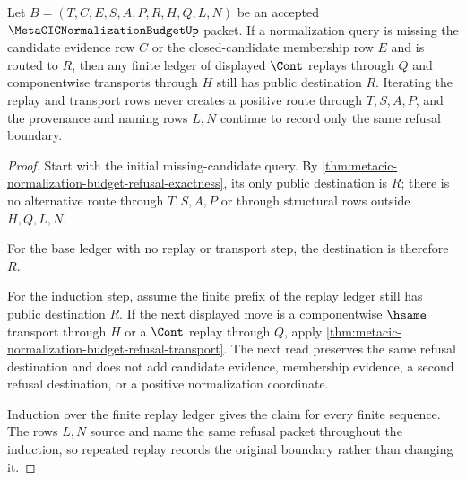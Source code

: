 \begin{theorem}
\label{thm:metacic-normalization-budget-refusal-idempotence}
Let $B=(T,C,E,S,A,P,R,H,Q,L,N)$ be an accepted $\MetaCICNormalizationBudgetUp$ packet. If a normalization query is missing the candidate evidence row $C$ or the closed-candidate membership row $E$ and is routed to $R$, then any finite ledger of displayed $\Cont$ replays through $Q$ and componentwise transports through $H$ still has public destination $R$. Iterating the replay and transport rows never creates a positive route through $T,S,A,P$, and the provenance and naming rows $L,N$ continue to record only the same refusal boundary.
\end{theorem}
\begin{proof}
Start with the initial missing-candidate query. By \autoref{thm:metacic-normalization-budget-refusal-exactness}, its only public destination is $R$; there is no alternative route through $T,S,A,P$ or through structural rows outside $H,Q,L,N$.

For the base ledger with no replay or transport step, the destination is therefore $R$.

For the induction step, assume the finite prefix of the replay ledger still has public destination $R$. If the next displayed move is a componentwise $\hsame$ transport through $H$ or a $\Cont$ replay through $Q$, apply \autoref{thm:metacic-normalization-budget-refusal-transport}. The next read preserves the same refusal destination and does not add candidate evidence, membership evidence, a second refusal destination, or a positive normalization coordinate.

Induction over the finite replay ledger gives the claim for every finite sequence. The rows $L,N$ source and name the same refusal packet throughout the induction, so repeated replay records the original boundary rather than changing it.
\end{proof}

